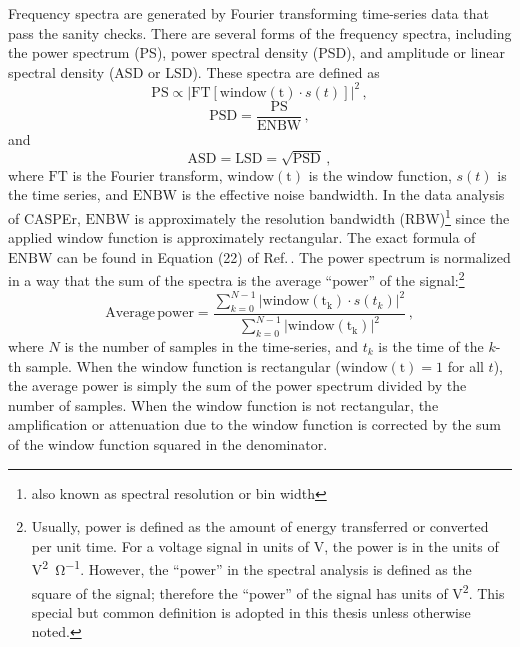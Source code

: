 Frequency spectra are generated by Fourier transforming time-series data that pass the sanity checks.
There are several forms of the frequency spectra, including the power spectrum (PS), power spectral density (PSD), and amplitude or linear spectral density (ASD or LSD).
These spectra are defined as
\begin{equation}
    \mathrm{PS} \propto \left|\mathrm{FT}[\mathrm{window(t)} \cdot s(t)]\right|^2
    \,,
\end{equation}
\begin{equation}
    \mathrm{PSD} = \frac{\mathrm{PS}}{\mathrm{ENBW}}
    \,,
\end{equation}
and
\begin{equation}
    \mathrm{ASD} = \mathrm{LSD} = \sqrt{\mathrm{PSD}}
    \,,
\end{equation}
where $\mathrm{FT}$ is the Fourier transform, $\mathrm{window(t)}$ is the window function, $s(t)$ is the time series, and $\mathrm{ENBW}$ is the effective noise bandwidth.
In the data analysis of CASPEr, $\mathrm{ENBW}$ is approximately the resolution bandwidth (RBW)\footnote{also known as spectral resolution or bin width} since the applied window function is approximately rectangular.
The exact formula of $\mathrm{ENBW}$ can be found in Equation (22) of Ref.\,\cite{Heinzel2002_SpectrumSpectralDensity}.
The power spectrum is normalized in a way that the sum of the spectra is the average ``power'' of the signal:\footnote{Usually, power is defined as the amount of energy transferred or converted per unit time. For a voltage signal in units of \unit{\volt}, the power is in the units of \unit{\volt^2\per\ohm}. However, the ``power'' in the spectral analysis is defined as the square of the signal; therefore the ``power'' of the signal has units of \unit{\volt^2}. This special but common definition is adopted in this thesis unless otherwise noted. }
\begin{equation}
    \mathrm{Average\,power} = \frac{\sum_{k=0}^{N-1}\left|\mathrm{window(t_k)} \cdot s(t_k)\right|^2}{\sum_{k=0}^{N-1}\left|\mathrm{window(t_k)}\right|^2}
    \,,
\end{equation}
where $N$ is the number of samples in the time-series, and $t_k$ is the time of the $k$-th sample.
When the window function is rectangular ($\mathrm{window(t)} = 1$ for all $t$), the average power is simply the sum of the power spectrum divided by the number of samples.
When the window function is not rectangular, the amplification or attenuation due to the window function is corrected by the sum of the window function squared in the denominator.

